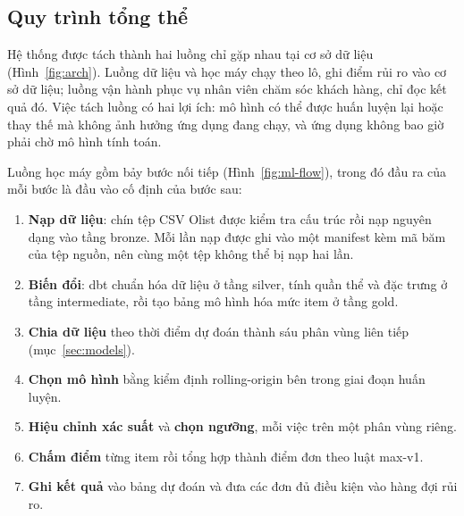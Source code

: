 \documentclass[12pt,a4paper]{report}
\begin{document}
\subsection{Quy trình tổng thể}

Hệ thống được tách thành hai luồng chỉ gặp nhau tại cơ sở dữ liệu (Hình~\ref{fig:arch}). Luồng dữ liệu và học máy chạy theo lô, ghi điểm rủi ro vào cơ sở dữ liệu; luồng vận hành phục vụ nhân viên chăm sóc khách hàng, chỉ đọc kết quả đó. Việc tách luồng có hai lợi ích: mô hình có thể được huấn luyện lại hoặc thay thế mà không ảnh hưởng ứng dụng đang chạy, và ứng dụng không bao giờ phải chờ mô hình tính toán.

Luồng học máy gồm bảy bước nối tiếp (Hình~\ref{fig:ml-flow}), trong đó đầu ra của mỗi bước là đầu vào cố định của bước sau:
\begin{enumerate}
  \item \textbf{Nạp dữ liệu}: chín tệp CSV Olist được kiểm tra cấu trúc rồi nạp nguyên dạng vào tầng bronze. Mỗi lần nạp được ghi vào một manifest kèm mã băm của tệp nguồn, nên cùng một tệp không thể bị nạp hai lần.
  \item \textbf{Biến đổi}: dbt chuẩn hóa dữ liệu ở tầng silver, tính quần thể và đặc trưng ở tầng intermediate, rồi tạo bảng mô hình hóa mức item ở tầng gold.
  \item \textbf{Chia dữ liệu} theo thời điểm dự đoán thành sáu phân vùng liên tiếp (mục~\ref{sec:models}).
  \item \textbf{Chọn mô hình} bằng kiểm định rolling-origin bên trong giai đoạn huấn luyện.
  \item \textbf{Hiệu chỉnh xác suất} và \textbf{chọn ngưỡng}, mỗi việc trên một phân vùng riêng.
  \item \textbf{Chấm điểm} từng item rồi tổng hợp thành điểm đơn theo luật max-v1.
  \item \textbf{Ghi kết quả} vào bảng dự đoán và đưa các đơn đủ điều kiện vào hàng đợi rủi ro.
\end{enumerate}
\end{document}
